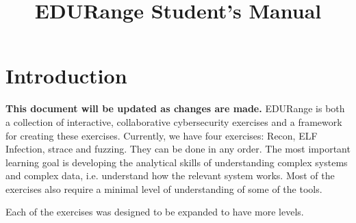 \documentclass[11pt]{report}
\begin{document}
\title{EDURange Student's Manual}
\maketitle

%  
\section{Introduction}
\label{sec:intro}
{\bf  This document will be updated as changes are made.}
EDURange is both a collection of interactive, collaborative cybersecurity exercises and a framework 
for creating these exercises.  Currently, we have four exercises:  Recon, ELF Infection, strace and 
fuzzing.  They can be done in any order.  The most important learning goal is developing the
analytical skills of understanding complex systems and complex data, i.e. 
understand how the relevant system works.  Most of the exercises also require a minimal level
of understanding of some of the tools.

 Each of the exercises was designed to be expanded to have more levels.
\end{document}
